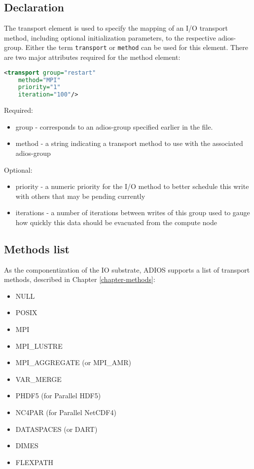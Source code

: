 \subsection{Declaration}

The transport element is used to specify the mapping of an I/O transport method, 
including optional initialization parameters, to the respective adios-group. 
Either the term \verb+transport+ or \verb+method+ can be used for this element. 
There are two major attributes required for the method element: 
\begin{lstlisting}[language=XML]
<transport group="restart"
    method="MPI"
    priority="1" 
    iteration="100"/>
\end{lstlisting}

Required:
\begin{itemize}
\item group - corresponds to an adios-group specified earlier in the file.
\item method - a string indicating a transport method to use with the associated adios-group
\end{itemize}

Optional: 
\begin{itemize}
\item priority - a numeric priority for the I/O method to better schedule this write with 
others that may be pending currently
\item iterations - a number of iterations between writes of this group used to gauge how 
quickly this data should be evacuated from the compute node
\end{itemize}

\subsection{Methods list}
As the componentization of the IO substrate, ADIOS supports a list of transport 
methods, described in Chapter \ref{chapter-methods}:

\begin{itemize}
\item NULL
\item POSIX
\item MPI
\item MPI\_LUSTRE
\item MPI\_AGGREGATE (or MPI\_AMR)
\item VAR\_MERGE
\item PHDF5 (for Parallel HDF5)
\item NC4PAR (for Parallel NetCDF4)
\item DATASPACES (or DART)
\item DIMES
\item FLEXPATH
\end{itemize}



